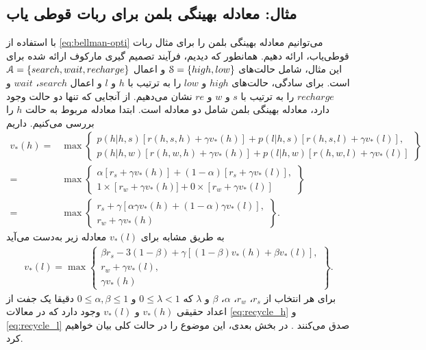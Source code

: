 \subsection{مثال: معادله بهینگی بلمن برای ربات قوطی یاب }
با استفاده از 
\ref{eq:bellman-opti}
می‌توانیم معادله بهینگی بلمن را برای مثال ربات قوطی‌یاب، ارائه دهیم. همانطور که دیدیم، فرآیند تصمیم گیری مارکوف ارائه شده برای این مثال، شامل حالت‌های 
$\EuScript{S} = \{high, low\}$
و اعمال 
$\EuScript{A} = \{search, wait, recharge\}$
است.
برای سادگی، حالت‌های $high$ و $low$ را به ترتیب با $h$ و $l$ و اعمال $search$،
$wait$
و
$recharge$
را به ترتیب با $s$ و $w$ و $re$ نشان می‌دهیم. از آنجایی که تنها دو حالت وجود دارد، معادله بهینگی بلمن شامل دو معادله است. ابتدا معادله مربوط به حالت $h$ را بررسی می‌کنیم. داریم
\begin{align}
v_*(h) =& \max \left\{ 
\begin{array}{lr}
   p(h|h,s) \left[ r(h,s,h)+ \gamma v_*(h) \right] + p(l|h,s) \left[ r(h,s,l)+\gamma v_*(l) \right], \\ 
   p(h|h,w)[r(h,w,h)+ \gamma v_*(h)]+p(l|h,w)[r(h,w,l)+\gamma v_*(l)]
\end{array}
\right\} \nonumber \\
 =& \max \left\{ 
\begin{array}{lr}
   \alpha \left[ r_s+ \gamma v_*(h) \right] + (1 - \alpha) \left[ r_s+\gamma v_*(l) \right], \\ 
   1 \times \left[ r_w + \gamma v_*(h)]+ 0 \times [r_w + \gamma v_*(l)]
\end{array}
\right\} \\
 =& \max \left\{ 
\begin{array}{lr}
   r_s + \gamma \left[  \alpha \gamma v_*(h) + (1 - \alpha) \gamma v_*(l) \right], \\ 
   r_w + \gamma v_* (h)
\end{array}
\right\}.
\label{eq:recycle_h}
\end{align}
به طریق مشابه برای 
$v_*(l)$
معادله زیر به‌دست می‌آید
\begin{align}
	v_*(l) = \max \left \{ 
	\begin{array}{lr}
		\beta r_s - 3(1-\beta) + \gamma \left[ (1-\beta) v_*(h)+\beta v_*(l)\right], \\
		r_w + \gamma v_*(l), \\
		\gamma v_*(h)
	\end{array}
	\right \}.
	\label{eq:recycle_l}
\end{align}
برای هر انتخاب از 
$r_s$،
$r_w$،
$\alpha$،
$\beta$
و $\lambda$ که 
$0 \le \lambda < 1$
و
$0 \le \alpha,\beta \le 1$
دقیقا یک جفت از اعداد حقیقی 
$v_*(h)$
و 
$v_*(l)$
وجود دارد که در معالات
\ref{eq:recycle_h}
و
\ref{eq:recycle_l}
 صدق می‌کنند
 \cite{suttonbook}.
در بخش بعدی، این موضوع را در حالت کلی بیان خواهیم کرد.
